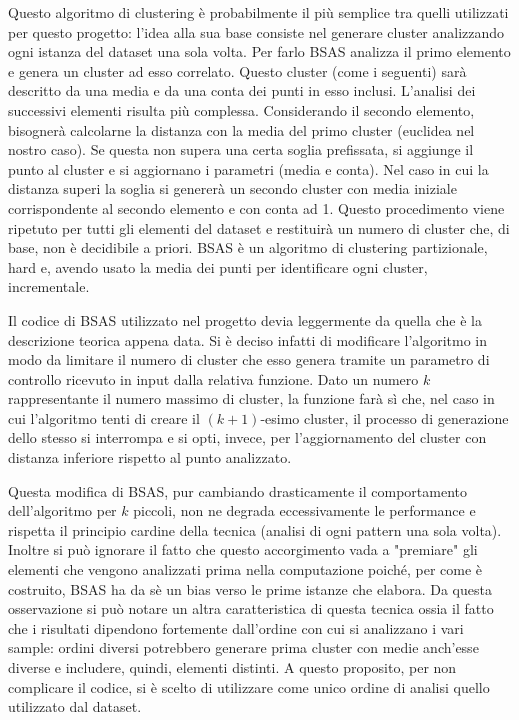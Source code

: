 \documentclass[]{report}
\begin{document}
	Questo algoritmo di clustering è probabilmente il più semplice tra quelli utilizzati per questo progetto: l'idea alla sua base consiste nel generare cluster analizzando ogni istanza del dataset una sola volta. Per farlo BSAS analizza il primo elemento e genera un cluster ad esso correlato. Questo cluster (come i seguenti) sarà descritto da una media e da una conta dei punti in esso inclusi. L'analisi dei successivi elementi risulta più complessa. Considerando il secondo elemento, bisognerà calcolarne la distanza con la media del primo cluster (euclidea nel nostro caso). Se questa non supera una certa soglia prefissata, si aggiunge il punto al cluster e si aggiornano i parametri (media e conta). Nel caso in cui la distanza superi la soglia si genererà un secondo cluster con media iniziale corrispondente al secondo elemento e con conta ad 1. Questo procedimento viene ripetuto per tutti gli elementi del dataset e restituirà un numero di cluster che, di base, non è decidibile a priori. BSAS è un algoritmo di clustering partizionale, hard e, avendo usato la media dei punti per identificare ogni cluster, incrementale.   
	
	Il codice di BSAS utilizzato nel progetto devia leggermente da quella che è la descrizione teorica appena data. Si è deciso infatti di modificare l'algoritmo in modo da limitare il numero di cluster che esso genera tramite un parametro di controllo ricevuto in input dalla relativa funzione. Dato un numero $k$ rappresentante il numero massimo di cluster, la funzione farà sì che, nel caso in cui l'algoritmo tenti di creare il $(k+1)$-esimo cluster, il processo di generazione dello stesso si interrompa e si opti, invece, per l'aggiornamento del cluster con distanza inferiore rispetto al punto analizzato.
	
	Questa modifica di BSAS, pur cambiando drasticamente il comportamento dell'algoritmo per $k$ piccoli, non ne degrada eccessivamente le performance e rispetta il principio cardine della tecnica (analisi di ogni pattern una sola volta). Inoltre si può ignorare il fatto che questo accorgimento vada a "premiare" gli elementi che vengono analizzati prima nella computazione poiché, per come è costruito, BSAS ha da sè un bias verso le prime istanze che elabora. Da questa osservazione si può notare un altra caratteristica di questa tecnica ossia il fatto che i risultati dipendono fortemente dall'ordine con cui si analizzano i vari sample: ordini diversi potrebbero generare prima cluster con medie anch'esse diverse e includere, quindi, elementi distinti. A questo proposito, per non complicare il codice, si è scelto di utilizzare come unico ordine di analisi quello utilizzato dal dataset.
	
\end{document}
